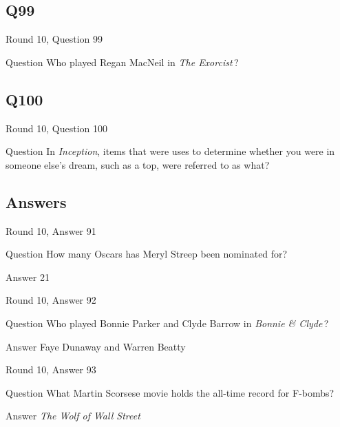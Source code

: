 \documentclass[11pt]{beamer}
\begin{document}
\subsection*{Q99}
\begin{frame}[t]{Round 10, Question 99}
\vspace{2em}
\begin{block}{Question}
Who played Regan MacNeil in \emph{The Exorcist}\,?
\end{block}
\end{frame}
    

\subsection*{Q100}
\begin{frame}[t]{Round 10, Question 100}
\vspace{2em}
\begin{block}{Question}
In \emph{Inception}, items that were uses to determine whether you were in someone else's dream, such as a top, were referred to as what?
\end{block}
\end{frame}
    
\subsection{Answers}

\begin{frame}[t]{Round 10, Answer 91}
\vspace{2em}
\begin{block}{Question}
How many Oscars has Meryl Streep been nominated for?
\end{block}
\pause{}
\begin{block}{Answer}
21
\end{block}
\end{frame}
    

\begin{frame}[t]{Round 10, Answer 92}
\vspace{2em}
\begin{block}{Question}
Who played Bonnie Parker and Clyde Barrow in \emph{Bonnie \& Clyde}\,?
\end{block}
\pause{}
\begin{block}{Answer}
Faye Dunaway and Warren Beatty
\end{block}
\end{frame}
    

\begin{frame}[t]{Round 10, Answer 93}
\vspace{2em}
\begin{block}{Question}
What Martin Scorsese movie holds the all-time record for F-bombs?
\end{block}
\pause{}
\begin{block}{Answer}
\emph{The Wolf of Wall Street}
\end{block}
\end{frame}
    
\end{document}
